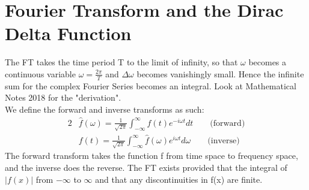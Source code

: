 \documentclass{report}
\begin{document}
\section*{Fourier Transform and the Dirac Delta Function}
\large{
	The FT takes the time period T to the limit of infinity, so that $\omega$ becomes a continuous variable $\omega = \frac{2\pi}{T}$ and $\Delta\omega$ becomes vanishingly small. Hence the infinite sum for the complex Fourier Series becomes an integral. Look at Mathematical Notes 2018 for the "derivation".\\
	We define the forward and inverse transforms as such:
	\begin{alignat*}{2}
		& \hat{f}(\omega) = \frac{1}{\sqrt{2\pi}}\int_{-\infty}^{\infty}f(t)e^{-i\omega t}dt \qquad \text{(forward)}\\
		& f(t) = \frac{1}{\sqrt{2\pi}}\int_{-\infty}^{\infty}\hat{f}(\omega)e^{i\omega t}d\omega \qquad \text{(inverse)}
	\end{alignat*}
	The forward transform takes the function f from time space to frequency space, and the inverse does the reverse. The FT exists provided that the integral of $|f(x)|$ from $-\infty$ to $\infty$ and that any discontinuities in f(x) are finite.
}
\end{document}
